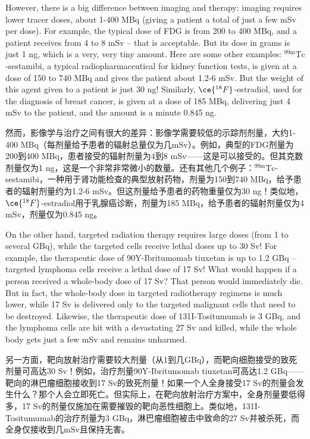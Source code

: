 \documentclass[dvipsnames, svgnames,a4paper,11pt]{article}
\begin{document}
However, there is a big difference between imaging and therapy: imaging requires lower tracer doses, about 1-400 MBq (giving a patient a total of just a few mSv per dose). For example, the typical dose of FDG is from 200 to 400 MBq, and a patient receives from 4 to 8 mSv – that is acceptable. But its dose in grams is just 1 ng, which is a very, very tiny amount. Here are some other examples: \(\mathrm{{}^{99m}Tc}\)-sestamibi, a typical radiopharmaceutical for kidney function tests, is given at a dose of 150 to 740 MBq and gives the patient about 1.2-6 mSv. But the weight of this agent given to a patient is just 30 ng! Similarly, \(\ce{^{18}F}\)-estradiol, used for the diagnosis of breast cancer, is given at a dose of 185 MBq, delivering just 4 mSv to the patient, and the amount is a minute 0.845 ng.

然而，影像学与治疗之间有很大的差异：影像学需要较低的示踪剂剂量，大约1-400 MBq（每剂量给予患者的辐射总量仅为几mSv）。例如，典型的FDG剂量为200到400 MBq，患者接受的辐射剂量为4到8 mSv——这是可以接受的。但其克数剂量仅为1 ng，这是一个非常非常微小的数量。还有其他几个例子：\(\mathrm{{}^{99m}Tc}\)-sestamibi，一种用于肾功能检查的典型放射药物，剂量为150到740 MBq，给予患者的辐射剂量约为1.2-6 mSv。但这剂量给予患者的药物重量仅为30 ng！类似地，\(\ce{^{18}F}\)-estradiol用于乳腺癌诊断，剂量为185 MBq，给予患者的辐射剂量仅为4 mSv，剂量仅为0.845 ng。

On the other hand, targeted radiation therapy requires large doses (from 1 to several GBq), while the targeted cells receive lethal doses up to 30 Sv! For example, the therapeutic dose of 90Y-Ibritumomab tiuxetan is up to 1.2 GBq – targeted lymphoma cells receive a lethal dose of 17 Sv! What would happen if a person received a whole-body dose of 17 Sv? That person would immediately die. But in fact, the whole-body dose in targeted radiotherapy regimens is much lower, while 17 Sv is delivered only to the targeted malignant cells that need to be destroyed. Likewise, the therapeutic dose of 131I-Tositumumab is 3 GBq, and the lymphoma cells are hit with a devastating 27 Sv and killed, while the whole body gets just a few mSv and remains unharmed.


另一方面，靶向放射治疗需要较大剂量（从1到几GBq），而靶向细胞接受的致死剂量可高达30 Sv！例如，治疗剂量90Y-Ibritumomab tiuxetan可高达1.2 GBq——靶向的淋巴瘤细胞接收到17 Sv的致死剂量！如果一个人全身接受17 Sv的剂量会发生什么？那个人会立即死亡。但实际上，在靶向放射治疗方案中，全身剂量要低得多，17 Sv的剂量仅施加在需要摧毁的靶向恶性细胞上。类似地，131I-Tositumumab的治疗剂量为3 GBq，淋巴瘤细胞被击中致命的27 Sv并被杀死，而全身仅接收到几mSv且保持无害。
\end{document}
